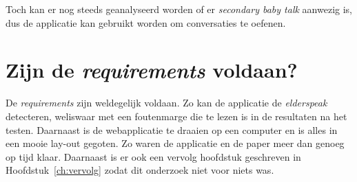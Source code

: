 Toch kan er nog steeds geanalyseerd worden of er \textit{secondary baby talk} aanwezig is, dus de applicatie kan gebruikt worden om conversaties te oefenen.

\section{Zijn de \textit{requirements} voldaan?}
De \textit{requirements} zijn weldegelijk voldaan. Zo kan de applicatie de \textit{elderspeak} detecteren, weliswaar met een foutenmarge die te lezen is in de resultaten na het testen.
Daarnaast is de webapplicatie te draaien op een computer en is alles in een mooie lay-out gegoten.
Zo waren de applicatie en de paper meer dan genoeg op tijd klaar. Daarnaast is er ook een vervolg hoofdstuk geschreven in Hoofdstuk~\ref{ch:vervolg} zodat dit onderzoek niet voor niets was.
